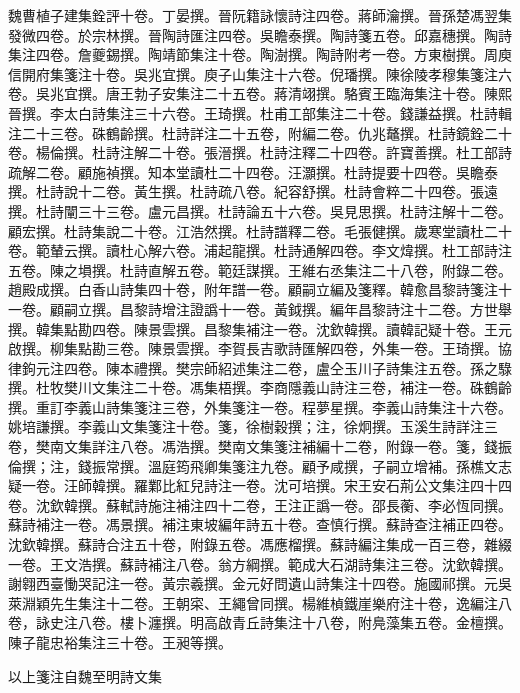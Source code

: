 \begin{pinyinscope}
魏曹植子建集銓評十卷。丁晏撰。晉阮籍詠懷詩注四卷。蔣師瀹撰。晉孫楚馮翌集發微四卷。於宗林撰。晉陶詩匯注四卷。吳瞻泰撰。陶詩箋五卷。邱嘉穗撰。陶詩集注四卷。詹夔錫撰。陶靖節集注十卷。陶澍撰。陶詩附考一卷。方東樹撰。周庾信開府集箋注十卷。吳兆宜撰。庾子山集注十六卷。倪璠撰。陳徐陵孝穆集箋注六卷。吳兆宜撰。唐王勃子安集注二十五卷。蔣清翊撰。駱賓王臨海集注十卷。陳熙晉撰。李太白詩集注三十六卷。王琦撰。杜甫工部集注二十卷。錢謙益撰。杜詩輯注二十三卷。硃鶴齡撰。杜詩詳注二十五卷，附編二卷。仇兆鼇撰。杜詩鏡銓二十卷。楊倫撰。杜詩注解二十卷。張溍撰。杜詩注釋二十四卷。許寶善撰。杜工部詩疏解二卷。顧施禎撰。知本堂讀杜二十四卷。汪灝撰。杜詩提要十四卷。吳瞻泰撰。杜詩說十二卷。黃生撰。杜詩疏八卷。紀容舒撰。杜詩會粹二十四卷。張遠撰。杜詩闡三十三卷。盧元昌撰。杜詩論五十六卷。吳見思撰。杜詩注解十二卷。顧宏撰。杜詩集說二十卷。江浩然撰。杜詩譜釋二卷。毛張健撰。歲寒堂讀杜二十卷。範輦云撰。讀杜心解六卷。浦起龍撰。杜詩通解四卷。李文煒撰。杜工部詩注五卷。陳之塤撰。杜詩直解五卷。範廷謀撰。王維右丞集注二十八卷，附錄二卷。趙殿成撰。白香山詩集四十卷，附年譜一卷。顧嗣立編及箋釋。韓愈昌黎詩箋注十一卷。顧嗣立撰。昌黎詩增注證譌十一卷。黃鉞撰。編年昌黎詩注十二卷。方世舉撰。韓集點勘四卷。陳景雲撰。昌黎集補注一卷。沈欽韓撰。讀韓記疑十卷。王元啟撰。柳集點勘三卷。陳景雲撰。李賀長吉歌詩匯解四卷，外集一卷。王琦撰。協律鉤元注四卷。陳本禮撰。樊宗師紹述集注二卷，盧仝玉川子詩集注五卷。孫之騄撰。杜牧樊川文集注二十卷。馮集梧撰。李商隱義山詩注三卷，補注一卷。硃鶴齡撰。重訂李義山詩集箋注三卷，外集箋注一卷。程夢星撰。李義山詩集注十六卷。姚培謙撰。李義山文集箋注十卷。箋，徐樹穀撰；注，徐炯撰。玉溪生詩詳注三卷，樊南文集詳注八卷。馮浩撰。樊南文集箋注補編十二卷，附錄一卷。箋，錢振倫撰；注，錢振常撰。溫庭筠飛卿集箋注九卷。顧予咸撰，子嗣立增補。孫樵文志疑一卷。汪師韓撰。羅鄴比紅兒詩注一卷。沈可培撰。宋王安石荊公文集注四十四卷。沈欽韓撰。蘇軾詩施注補注四十二卷，王注正譌一卷。邵長蘅、李必恆同撰。蘇詩補注一卷。馮景撰。補注東坡編年詩五十卷。查慎行撰。蘇詩查注補正四卷。沈欽韓撰。蘇詩合注五十卷，附錄五卷。馮應榴撰。蘇詩編注集成一百三卷，雜綴一卷。王文浩撰。蘇詩補注八卷。翁方綱撰。範成大石湖詩集注三卷。沈欽韓撰。謝翱西臺慟哭記注一卷。黃宗羲撰。金元好問遺山詩集注十四卷。施國祁撰。元吳萊淵穎先生集注十二卷。王朝寀、王繩曾同撰。楊維楨鐵崖樂府注十卷，逸編注八卷，詠史注八卷。樓卜瀍撰。明高啟青丘詩集注十八卷，附鳧藻集五卷。金檀撰。陳子龍忠裕集注三十卷。王昶等撰。

以上箋注自魏至明詩文集


\end{pinyinscope}
